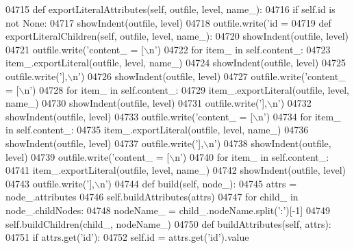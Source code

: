 \begin{DoxyCode}
{{{{{{{{{{{{{{{{{{{{{{{{{{{{{{{{{{{{{{{{{{{{{{{{{{{{{{{{{{{{{{{{{{{{{{{{{{{{{{{{{{{{{{{{{{{{{{{{{{{{{{{{{{{{{{{{{{{{{{{{{{{{{{{{{{{{{{{{{{{{{{{{{{{{{{{{{{{{{{{{{{{{{{{{{{{{{{{{{{{{{{{{{{{{{{{{{{{{{{{{{{{{{{{{{{{{{{{{{{{{{{{{{{{{{{{{{{{{{{{{{{{{{{{{{{{{{{{{{{{{{{{{{{{{{{{{{{{{{{{{{{{{{{{{{{{{{{{{{{{{{{{{{{{{{{{{{{{{{{{{{{{04715     \textcolor{keyword}{def }exportLiteralAttributes(self, outfile, level, name\_):
04716         \textcolor{keywordflow}{if} self.id \textcolor{keywordflow}{is} \textcolor{keywordflow}{not} \textcolor{keywordtype}{None}:
04717             showIndent(outfile, level)
04718             outfile.write(\textcolor{stringliteral}{'id = %
04719     \textcolor{keyword}{def }exportLiteralChildren(self, outfile, level, name\_):
04720         showIndent(outfile, level)
04721         outfile.write(\textcolor{stringliteral}{'content\_ = [\(\backslash\)n'})
04722         \textcolor{keywordflow}{for} item\_ \textcolor{keywordflow}{in} self.content_:
04723             item\_.exportLiteral(outfile, level, name\_)
04724         showIndent(outfile, level)
04725         outfile.write(\textcolor{stringliteral}{'],\(\backslash\)n'})
04726         showIndent(outfile, level)
04727         outfile.write(\textcolor{stringliteral}{'content\_ = [\(\backslash\)n'})
04728         \textcolor{keywordflow}{for} item\_ \textcolor{keywordflow}{in} self.content_:
04729             item\_.exportLiteral(outfile, level, name\_)
04730         showIndent(outfile, level)
04731         outfile.write(\textcolor{stringliteral}{'],\(\backslash\)n'})
04732         showIndent(outfile, level)
04733         outfile.write(\textcolor{stringliteral}{'content\_ = [\(\backslash\)n'})
04734         \textcolor{keywordflow}{for} item\_ \textcolor{keywordflow}{in} self.content_:
04735             item\_.exportLiteral(outfile, level, name\_)
04736         showIndent(outfile, level)
04737         outfile.write(\textcolor{stringliteral}{'],\(\backslash\)n'})
04738         showIndent(outfile, level)
04739         outfile.write(\textcolor{stringliteral}{'content\_ = [\(\backslash\)n'})
04740         \textcolor{keywordflow}{for} item\_ \textcolor{keywordflow}{in} self.content_:
04741             item\_.exportLiteral(outfile, level, name\_)
04742         showIndent(outfile, level)
04743         outfile.write(\textcolor{stringliteral}{'],\(\backslash\)n'})
04744     \textcolor{keyword}{def }build(self, node\_):
04745         attrs = node\_.attributes
04746         self.buildAttributes(attrs)
04747         \textcolor{keywordflow}{for} child\_ \textcolor{keywordflow}{in} node\_.childNodes:
04748             nodeName\_ = child\_.nodeName.split(\textcolor{stringliteral}{':'})[-1]
04749             self.buildChildren(child\_, nodeName\_)
04750     \textcolor{keyword}{def }buildAttributes(self, attrs):
04751         \textcolor{keywordflow}{if} attrs.get(\textcolor{stringliteral}{'id'}):
04752             self.id = attrs.get(\textcolor{stringliteral}{'id'}).value
}}}}}}}}}}}}}}}}}}}}}}}}}}}}}}}}}}}}}}}}}}}}}}}}}}}}}}}}}}}}}}}}}}}}}}}}}}}}}}}}}}}}}}}}}}}}}}}}}}}}}}}}}}}}}}}}}}}}}}}}}}}}}}}}}}}}}}}}}}}}}}}}}}}}}}}}}}}}}}}}}}}}}}}}}}}}}}}}}}}}}}}}}}}}}}}}}}}}}}}}}}}}}}}}}}}}}}}}}}}}}}}}}}}}}}}}}}}}}}}}}}}}}}}}}}}}}}}}}}}}}}}}}}}}}}}}}}}}}}}}}}}}}}}}}}}}}}}}}}}}}}}}}}}}}}}}}}}}}}}}}}}}
\end{DoxyCode}
